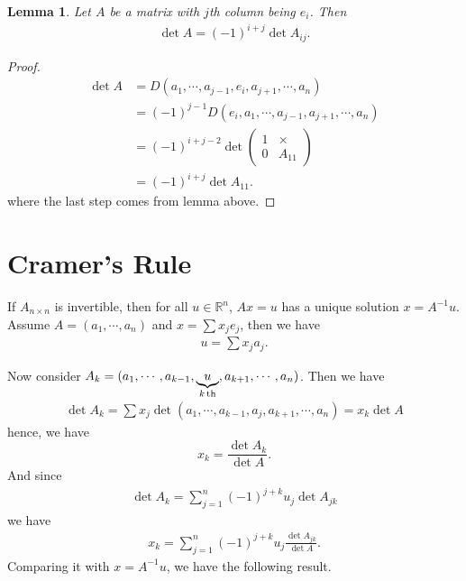 \documentclass[11pt]{book}
\newtheorem{lemma}[theorem]{Lemma}
\theoremstyle{definition}
\numberwithin{equation}{chapter}
\begin{document}
\begin{lemma}
Let $A$ be a matrix with $j$th column being $e_i$. Then 
\begin{align*}
    \det A = (-1)^{i+j} \det A_{ij}.
\end{align*}
\end{lemma}
\begin{proof}
\begin{align*}
    \det A & = D(a_1,\cdots,a_{j-1}, e_i, a_{j+1}, \cdots, a_n) \\
    & = (-1)^{j-1} D(e_i, a_1,\cdots,a_{j-1}, a_{j+1}, \cdots, a_n) \\
    & = (-1)^{i+j-2} \det \left(
    \begin{matrix}
        1 & \times\\
        0 & A_{11}
    \end{matrix}
    \right) \\
    & = (-1)^{i+j} \det A_{11}.
\end{align*}
where the last step comes from lemma above. 
\end{proof}

\medskip

\section{Cramer's Rule}

If $A_{n\times n}$ is invertible, then for all $u\in\mathbb{R}^n$, $Ax = u$ has a unique solution $x = A^{-1}u$. Assume $A = (a_1, \cdots, a_n)$ and $x = \sum x_j e_j$, then we have 
\begin{align*}
    u = \sum x_j a_j.
\end{align*}

Now consider $A_k = (a_1, \cdots, a_{k-1}, \underbrace{u}_{k\,{\rm th}}, a_{k+1}, \cdots, a_n)$. Then we have 
\begin{align*}
    \det A_k = \sum x_j \det (a_1, \cdots, a_{k-1}, a_j, a_{k+1}, \cdots, a_n) = x_k \det A
\end{align*}
hence, we have
$$x_k = \frac{\det A_k}{\det A}.$$
And since 
\begin{align*}
    \det A_k = \sum^n_{j=1} (-1)^{j+k} u_j \det A_{jk}
\end{align*}
we have 
\begin{align*}
    x_k = \sum^n_{j=1} (-1)^{j+k} u_j \frac{\det A_{jk}}{\det A}.
\end{align*}
Comparing it with $x = A^{-1} u$, we have the following result.

\medskip
\end{document}
